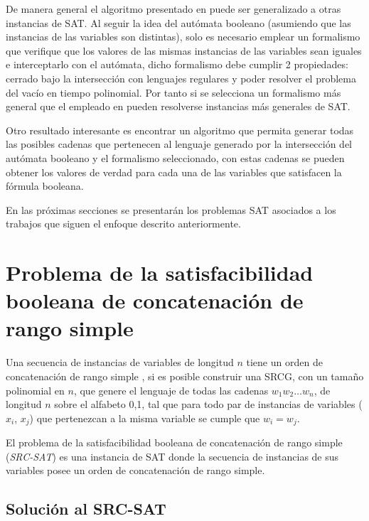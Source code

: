 \documentclass[12pt]{article}
\begin{document}
De manera general el algoritmo presentado en \cite{aCFSAT} puede ser generalizado a otras instancias de SAT. Al seguir
la idea del autómata booleano (asumiendo que las instancias de las variables son distintas), solo es necesario emplear un
formalismo que verifique que los valores de las mismas instancias de las variables sean iguales e interceptarlo con el autómata, 
dicho formalismo debe cumplir 2 propiedades: cerrado bajo la intersección con lenguajes regulares y poder resolver el problema 
del vacío en tiempo polinomial. Por tanto si se selecciona un formalismo más general que el empleado en \cite{aCFSAT}
pueden resolverse instancias más generales de SAT. 

Otro resultado interesante es encontrar un algoritmo que permita generar todas las posibles cadenas que pertenecen al lenguaje
generado por la intersección del autómata booleano y el formalismo seleccionado, con estas cadenas se pueden obtener los valores de
verdad para cada una de las variables que satisfacen la fórmula booleana.

En las próximas secciones se presentarán los problemas SAT asociados a los trabajos que siguen el enfoque descrito anteriormente.

\section{Problema de la satisfacibilidad booleana de concatenación de rango simple}

Una secuencia de instancias de variables de longitud $n$ tiene un orden de concatenación de rango simple \cite{aSRCSAT}, 
si es posible construir una SRCG, con un tamaño polinomial en $n$, que genere el lenguaje de todas las cadenas 
$w_1w_2 \ldots w_n$, de longitud $n$ sobre el alfabeto {0,1}, tal que para todo par de instancias de variables 
($x_i$, $x_j$) que pertenezcan a la misma variable se cumple que $w_i = w_j$.

El problema de la satisfacibilidad booleana de concatenación de rango simple (\textit{SRC-SAT}) es una instancia de
SAT donde la secuencia de instancias de sus variables posee un orden de concatenación de rango simple.

\subsection{Solución al SRC-SAT}
\end{document}
